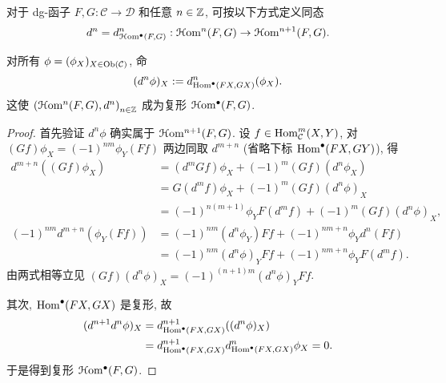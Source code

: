 \begin{definition-proposition}
	对于 dg-函子 $F, G: \mathcal{C} \to \mathcal{D}$ 和任意 $n \in \mathbb{Z}$, 可按以下方式定义同态
	\[ d^n = d^n_{\EuScript{H}\mathrm{om}^\bullet(F, G)}: \EuScript{H}\mathrm{om}^n(F, G) \to \EuScript{H}\mathrm{om}^{n+1}(F, G). \]
	
	对所有 $\phi = (\phi_X)_{X \in \operatorname{Ob}(\mathcal{C})}$, 命
	\[ (d^n \phi)_X := d^n_{\operatorname{Hom}^\bullet(FX, GX)}(\phi_X). \]
	这使 $\left(\EuScript{H}\mathrm{om}^n(F, G), d^n \right)_{n \in \mathbb{Z}}$ 成为复形 $\EuScript{H}\mathrm{om}^\bullet(F, G)$.
\end{definition-proposition}
\begin{proof}
	首先验证 $d^n \phi$ 确实属于 $\EuScript{H}\mathrm{om}^{n+1}(F, G)$. 设 $f \in \operatorname{Hom}^m_{\mathcal{C}}(X, Y)$, 对 $(Gf) \phi_X = (-1)^{nm} \phi_Y (Ff)$ 两边同取 $d^{m+n}$ (省略下标 $\operatorname{Hom}^\bullet(FX, GY)$), 得
	\begin{align*}
		d^{m+n}((Gf) \phi_X) & = (d^m Gf) \phi_X + (-1)^m (Gf) (d^n \phi_X) \\
		& = G (d^m f) \phi_X + (-1)^m (Gf) (d^n \phi)_X \\
		& = (-1)^{n(m+1)} \phi_Y F(d^m f) + (-1)^m (Gf) (d^n \phi)_X, \\
		(-1)^{nm} d^{m+n}(\phi_Y (Ff)) & = (-1)^{nm} (d^n \phi_Y) Ff + (-1)^{nm+n} \phi_Y d^n(Ff) \\
		& = (-1)^{nm} (d^n \phi)_Y Ff + (-1)^{nm+n} \phi_Y F(d^m f).
	\end{align*}
	由两式相等立见 $(Gf) (d^n \phi)_X = (-1)^{(n+1)m} (d^n \phi)_Y Ff$.
	
	其次, $\operatorname{Hom}^\bullet(FX, GX)$ 是复形, 故
	\begin{align*}
		(d^{n+1} d^n \phi)_X & = d^{n+1}_{\operatorname{Hom}^\bullet(FX, GX)}((d^n \phi)_X) \\
		& = d^{n+1}_{\operatorname{Hom}^\bullet(FX, GX)} d^n_{\operatorname{Hom}^\bullet(FX, GX)} \phi_X = 0.
	\end{align*}
	于是得到复形 $\EuScript{H}\mathrm{om}^\bullet(F, G)$.
\end{proof}


